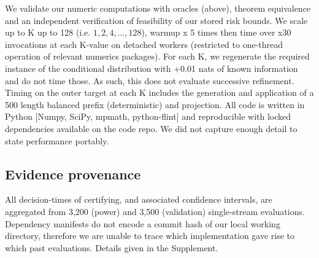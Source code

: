 We validate our numeric computations with oracles (above), theorem equivalence and an independent verification of feasibility of our stored risk bounds. We scale up to K up to 128 (i.e. $1,2,4,\ldots,128$), warmup x 5 times then time over x30 invocations at each K-value on detached workers (restricted to one-thread operation of relevant numerics packages). For each K, we regenerate the required instance of the conditional distribution with +0.01 nats of known information and do not time those. As such, this does not evaluate successive refinement. Timing on the outer target at each K includes the generation and application of a 500 length balanced prefix (deterministic) and projection. All code is written in Python [Numpy, SciPy, mpmath, python-flint] and reproducible with locked dependencies available on the code repo. We did not capture enough detail to state performance portably.

\subsection{Evidence provenance}\label{sec:provenance} 
All decision-times of certifying, and associated confidence intervals, are aggregated from 3,200 (power) and 3,500 (validation) single-stream evaluations. Dependency manifests do not encode a commit hash of our local working directory, therefore we are unable to trace which implementation gave rise to which past evaluations. Details given in the Supplement. 